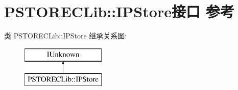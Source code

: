 \hypertarget{interface_p_s_t_o_r_e_c_lib_1_1_i_p_store}{}\section{P\+S\+T\+O\+R\+E\+C\+Lib\+:\+:I\+P\+Store接口 参考}
\label{interface_p_s_t_o_r_e_c_lib_1_1_i_p_store}
类 P\+S\+T\+O\+R\+E\+C\+Lib\+:\+:I\+P\+Store 继承关系图\+:\begin{figure}[H]
\begin{center}
\leavevmode
\includegraphics[height=2.000000cm]{interface_p_s_t_o_r_e_c_lib_1_1_i_p_store}
\end{center}
\end{figure}
